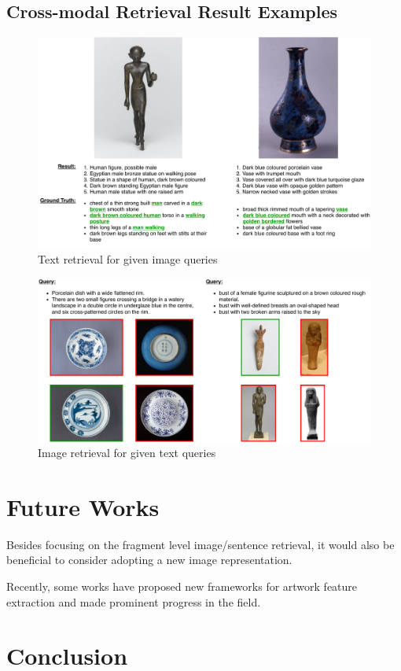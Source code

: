 \subsection{Cross-modal Retrieval Result Examples}


\begin{figure}[h!]
\centering
\includegraphics[width=\textwidth]{i2t.pdf}
\caption{Text retrieval for given image queries}
\label{fig:i2t}
\end{figure}


\begin{figure}[h!]
\centering
\includegraphics[width=\textwidth]{t2i.pdf}
\caption{Image retrieval for given text queries
}
\label{fig:t2i}
\end{figure}

\section{Future Works}
Besides focusing on the fragment level image/sentence retrieval, it would also be beneficial to consider adopting a new image representation. 

Recently, some works \cite{TranslatingArtworks,parttowhole,Art2Real} have proposed new frameworks for artwork feature extraction and made prominent progress in the field. 


\section{Conclusion}


